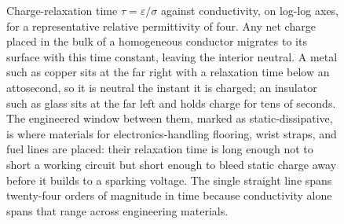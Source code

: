 \begin{figure}[htbp]
\centering
{}
\caption[Charge-relaxation time against conductivity]{Charge-relaxation
time $\tau = \varepsilon/\sigma$ against conductivity, on log-log axes, for
a representative relative permittivity of four. Any net charge placed in
the bulk of a homogeneous conductor migrates to its surface with this time
constant, leaving the interior neutral. A metal such as copper sits at the
far right with a relaxation time below an attosecond, so it is neutral the
instant it is charged; an insulator such as glass sits at the far left and
holds charge for tens of seconds. The engineered window between them, marked
as static-dissipative, is where materials for electronics-handling
flooring, wrist straps, and fuel lines are placed: their relaxation time is
long enough not to short a working circuit but short enough to bleed static
charge away before it builds to a sparking voltage. The single straight
line spans twenty-four orders of magnitude in time because conductivity
alone spans that range across engineering materials.}
\label{fig:vol04ch08:charge-relaxation}
\end{figure}
